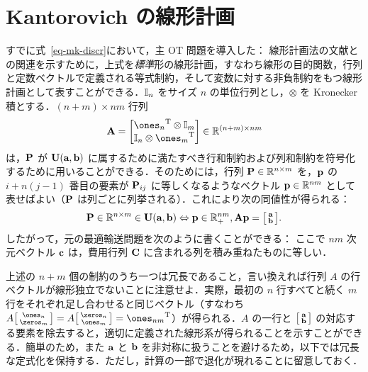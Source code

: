 \section{Kantorovich の線形計画}\label{s-kantorovich}
すでに式~\eqref{eq-mk-discr}において，主 OT 問題を導入した：
線形計画法の文献との関連を示すために，上式を\emph{標準}形の線形計画，すなわち線形の目的関数，行列と定数ベクトルで定義される等式制約，そして変数に対する非負制約をもつ線形計画として表すことができる．$\Identity_n$ をサイズ $n$ の単位行列とし，$\otimes$ を Kronecker 積とする．${(n+m) \times nm}$ 行列
$$
\mathbf{A}= \begin{bmatrix}
	\transp{\ones_{n}} \otimes \Identity_m \\
	\Identity_n \otimes \transp{\ones_{m}}
\end{bmatrix}\in\RR^{(n+m)\times nm}
$$
は，$\P$ が $\CouplingsD(\a,\b)$ に属するために満たすべき行和制約および列和制約を符号化するために用いることができる．そのためには，行列 $\P\in\RR^{n\times m}$ を，$\p$ の $i+n(j-1)$ 番目の要素が $\P_{ij}$ に等しくなるようなベクトル $\p\in\RR^{nm}$ として表せばよい（$\P$ は列ごとに列挙される）．これにより次の同値性が得られる：
$$\P\in \RR^{n\times m}\in \CouplingsD(\a,\b) \Leftrightarrow \p\in\RR^{nm}_+, \mathbf{A}\p = \bigl[\begin{smallmatrix}\a\\ \b \end{smallmatrix} \bigr].$$
したがって，元の最適輸送問題を次のように書くことができる：
ここで $nm$ 次元ベクトル $\cc$ は，費用行列 $\C$ に含まれる列を積み重ねたものに等しい．

\begin{rem}\label{rem-transportation-polytope} 上述の $n+m$ 個の制約のうち一つは冗長であること，言い換えれば行列 $A$ の行ベクトルが線形独立でないことに注意せよ．実際，最初の $n$ 行すべてと続く $m$ 行をそれぞれ足し合わせると同じベクトル（すなわち $A \bigl[\begin{smallmatrix} \ones_n\\\zeros_m \end{smallmatrix}\bigr] = A \bigl[\begin{smallmatrix} \zeros_n\\\ones_m\end{smallmatrix}\bigr]=\transp{\ones_{nm}}$）が得られる．$A$ の一行と $\bigl[\begin{smallmatrix}\a\\ \b \end{smallmatrix}\bigr]$ の対応する要素を除去すると，適切に定義された線形系が得られることを示すことができる．簡単のため，また $\a$ と $\b$ を非対称に扱うことを避けるため，以下では冗長な定式化を保持する．ただし，計算の一部で退化が現れることに留意しておく．\end{rem}

